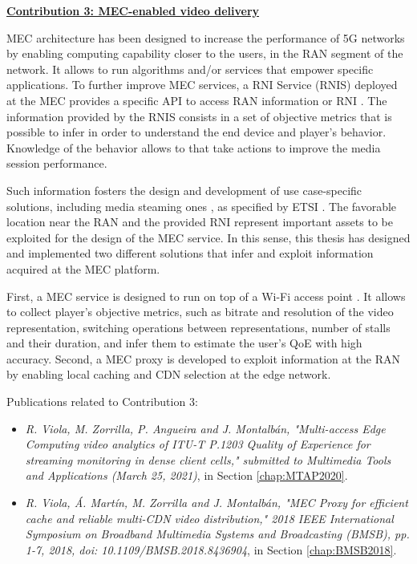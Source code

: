\textbf{\underline{Contribution 3: MEC-enabled video delivery}}
\label{contribution:3}

MEC architecture \cite{etsi2019} has been designed to increase the performance of 5G networks by enabling computing capability closer to the users, in the RAN segment of the network. It allows to run algorithms and/or services that empower specific applications. To further improve MEC services, a RNI Service (RNIS) deployed at the MEC provides a specific API to access RAN information or RNI \cite{etsigsmec012}. The information provided by the RNIS consists in a set of objective metrics that is possible to infer in order to understand the end device and player's behavior. Knowledge of the behavior allows to that take actions to improve the media session performance.

Such information fosters the design and development of use case-specific solutions, including media steaming ones \cite{Tan2018, Martin2019}, as specified by ETSI \cite{etsigsmec002}. The favorable location near the RAN and the provided RNI represent important assets to be exploited for the design of the MEC service. In this sense, this thesis has designed and implemented two different solutions that infer and exploit information acquired at the MEC platform.

First, a MEC service is designed to run on top of a Wi-Fi access point \cite{etsigsmecwifi}. It allows to collect player's objective metrics, such as bitrate and resolution of the video representation, switching operations between representations, number of stalls and their duration, and infer them to estimate the user's QoE with high accuracy. Second, a MEC proxy is developed to exploit information at the RAN by enabling local caching and CDN selection at the edge network.

Publications related to Contribution 3:
\begin{itemize}
	\item \textit{R. Viola, M. Zorrilla, P. Angueira and J. Montalb\'an, "Multi-access Edge Computing video analytics of ITU-T P.1203 Quality of Experience for streaming monitoring in dense client cells," submitted to Multimedia Tools and Applications (March 25, 2021)}, in Section \ref{chap:MTAP2020}.
	\item \textit{R. Viola, \'A. Mart\'in, M. Zorrilla and J. Montalb\'an, "MEC Proxy for efficient cache and reliable multi-CDN video distribution," 2018 IEEE International Symposium on Broadband Multimedia Systems and Broadcasting (BMSB), pp. 1-7, 2018, doi: 10.1109/BMSB.2018.8436904}, in Section \ref{chap:BMSB2018}.
\end{itemize}

